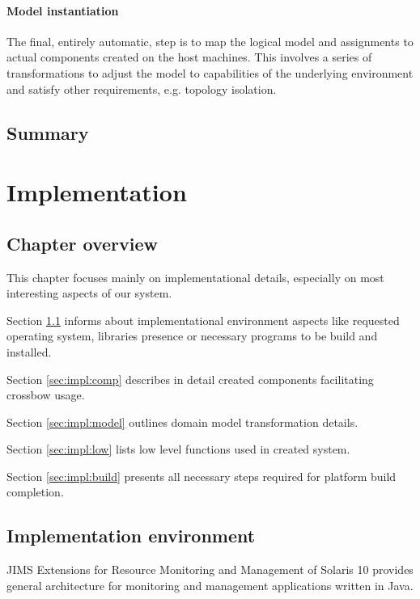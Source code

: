 \documentclass[11pt]{book}
\begin{document}
        \subsubsection{Model instantiation}

          The final, entirely automatic, step is to map the logical model and assignments to actual components created
          on the host machines. This involves a series of transformations to adjust the model to capabilities of the
          underlying environment and satisfy other requirements, e.g. topology isolation.


    \section*{Summary}


  \chapter{Implementation}
    
    \section*{Chapter overview}
	
      This chapter focuses mainly on implementational details, especially on most interesting aspects of our system.
		
      Section \ref{sec:impl:env} informs about implementational environment aspects like requested operating system,
      libraries presence or necessary programs to be build and installed. 

      Section \ref{sec:impl:comp} describes in detail created components facilitating crossbow usage.

      Section \ref{sec:impl:model} outlines domain model transformation details.

      Section \ref{sec:impl:low} lists low level functions used in created system.
	
      Section \ref{sec:impl:build} presents all necessary steps required for platform build completion.


    \section{Implementation environment}
    \label{sec:impl:env}

      JIMS Extensions for Resource Monitoring and Management of Solaris 10 provides general architecture for monitoring
      and management applications written in Java. 
\end{document}
